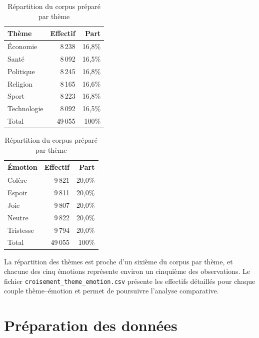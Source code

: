 \documentclass[11pt,a4paper]{article}
\begin{document}
\begin{table}[H]
\centering
\caption{Répartition du corpus préparé par thème}
\begin{tabular}{lrr}
\toprule Thème & Effectif & Part \\
\midrule
Économie & 8\,238 & 16,8\% \\
Santé & 8\,092 & 16,5\% \\
Politique & 8\,245 & 16,8\% \\
Religion & 8\,165 & 16,6\% \\
Sport & 8\,223 & 16,8\% \\
Technologie & 8\,092 & 16,5\% \\
\midrule Total & 49\,055 & 100\% \\
\bottomrule
\end{tabular}
\hspace{1.2cm}
\begin{tabular}{lrr}
\toprule Émotion & Effectif & Part \\
\midrule
Colère & 9\,821 & 20,0\% \\
Espoir & 9\,811 & 20,0\% \\
Joie & 9\,807 & 20,0\% \\
Neutre & 9\,822 & 20,0\% \\
Tristesse & 9\,794 & 20,0\% \\
\midrule Total & 49\,055 & 100\% \\
\bottomrule
\end{tabular}
\end{table}

La répartition des thèmes est proche d'un sixième du corpus par thème, et chacune des cinq émotions représente environ un cinquième des observations. Le fichier \texttt{croisement\_theme\_emotion.csv} présente les effectifs détaillés pour chaque couple thème--émotion et permet de poursuivre l'analyse comparative.

\section{Préparation des données}
\end{document}
